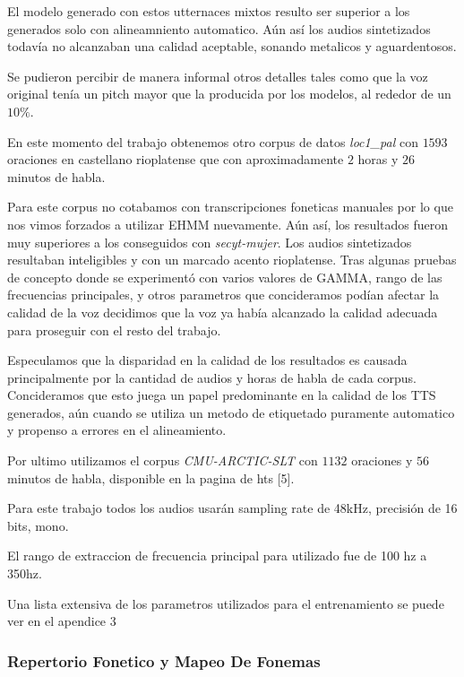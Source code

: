 El modelo generado con estos utternaces mixtos resulto ser superior a los generados solo con alineamniento automatico. Aún así los audios sintetizados todavía no alcanzaban una calidad aceptable, sonando metalicos y aguardentosos.

Se pudieron percibir de manera informal otros detalles tales como que la voz original tenía un pitch mayor que la producida por los modelos, al rededor de un $10\%$.

En este momento del trabajo obtenemos otro corpus de datos \textit{loc1\_pal} con $1593$ oraciones en castellano rioplatense que con aproximadamente $2$ horas y $26$ minutos de habla.

Para este corpus no cotabamos con transcripciones foneticas manuales por lo que nos vimos forzados a utilizar EHMM nuevamente. Aún así, los resultados fueron muy superiores a los conseguidos con \textit{secyt-mujer}. Los audios sintetizados resultaban inteligibles y con un marcado acento rioplatense. Tras algunas pruebas de concepto donde se experimentó con varios valores de GAMMA, rango de las frecuencias principales, y otros parametros que concideramos podían afectar la calidad de la voz decidimos que la voz ya había alcanzado la calidad adecuada para proseguir con el resto del trabajo.

Especulamos que la disparidad en la calidad de los resultados es causada principalmente por la cantidad de audios y horas de habla de cada corpus. Concideramos que esto juega un papel predominante en la calidad de los TTS generados, aún cuando se utiliza un metodo de etiquetado puramente automatico y propenso a errores en el alineamiento.

Por ultimo utilizamos el corpus \textit{CMU-ARCTIC-SLT} con $1132$ oraciones y $56$ minutos de habla, disponible en la pagina de hts [5].

Para este trabajo todos los audios usarán sampling rate de 48kHz, precisión de 16 bits, mono.

El rango de extraccion de frecuencia principal para  utilizado fue de 100 hz a 350hz.

Una lista extensiva de los parametros utilizados para el entrenamiento se puede ver en el apendice 3


\subsubsection{Repertorio Fonetico y Mapeo De Fonemas}


